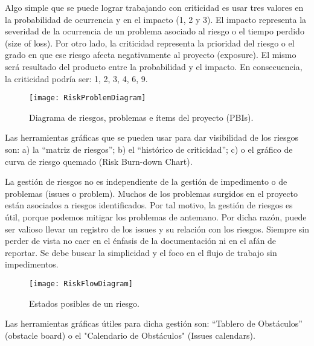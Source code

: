 Algo simple que se puede lograr trabajando con criticidad es usar tres valores en la probabilidad de ocurrencia y en el impacto (1, 2 y 3). El impacto representa la severidad de la ocurrencia de un problema asociado al riesgo o el tiempo perdido (size of loss). Por otro lado, la criticidad representa la prioridad del riesgo o el grado en que ese riesgo afecta negativamente al proyecto (exposure). El mismo será resultado del producto entre la probabilidad y el impacto. En consecuencia, la criticidad podría ser: 1, 2, 3, 4, 6, 9.

\begin{figure}[h]
  \centering
  \texttt{[image: RiskProblemDiagram]}
  \caption{Diagrama de riesgos, problemas e ítems del proyecto (PBIs).}
  \centering
  \label{fig:RiskProblemDiagram} %
\end{figure}

Las herramientas gráficas que se pueden usar para dar visibilidad de los riesgos son: a) la “matriz de riesgos”; b) el “histórico de criticidad”; c) o el gráfico de curva de riesgo quemado (Risk Burn-down Chart).

La gestión de riesgos no es independiente de la gestión de impedimento o de problemas (issues o problem). Muchos de los problemas surgidos en el proyecto están asociados a riesgos identificados. Por tal motivo, la gestión de riesgos es útil, porque podemos mitigar los problemas de antemano. Por dicha razón, puede ser valioso llevar un registro de los issues y su relación con los riesgos. Siempre sin perder de vista no caer en el énfasis de la documentación ni en el afán de reportar. Se debe buscar la simplicidad y el foco en el flujo de trabajo sin impedimentos.

\begin{figure}[h]
  \centering
  \texttt{[image: RiskFlowDiagram]}
  \caption{Estados posibles de un riesgo.}
  \centering
  \label{fig:RiskFlowDiagram} %
\end{figure}

Las herramientas gráficas útiles para dicha gestión son: “Tablero de Obstáculos” (obstacle board) o el "Calendario de Obstáculos" (Issues calendars).
